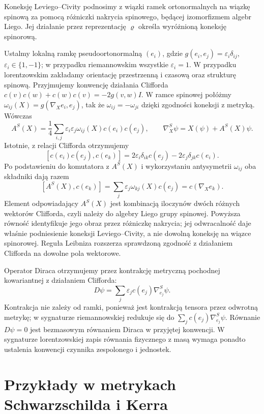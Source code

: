 \begin{uwaga}
Koneksję Leviego--Civity podnosimy z wiązki ramek
ortonormalnych na wiązkę spinową za pomocą różniczki
nakrycia spinowego, będącej izomorfizmem algebr Liego.
Jej działanie przez reprezentację $\varrho$ określa
wyróżnioną koneksję spinorową.

Ustalmy lokalną ramkę pseudoortonormalną $(e_i)$,
gdzie $g(e_i,e_j)=\varepsilon_i\delta_{ij}$,
$\varepsilon_i\in\{1,-1\}$; w przypadku riemannowskim
wszystkie $\varepsilon_i=1$. W przypadku lorentzowskim
zakładamy orientację przestrzenną i czasową oraz strukturę
spinową. Przyjmujemy konwencję działania Clifforda
$c(v)c(w)+c(w)c(v)=-2g(v,w)I$.
W ramce spinowej połóżmy
$\omega_{ij}(X)=g(\nabla_X e_i,e_j)$, tak że
$\omega_{ij}=-\omega_{ji}$ dzięki zgodności koneksji z metryką.
Wówczas
\[
 A^S(X)=\frac14\sum_{i,j}\varepsilon_i\varepsilon_j
       \omega_{ij}(X)c(e_i)c(e_j),
 \qquad \nabla_X^S\psi=X(\psi)+A^S(X)\psi .
\]
Istotnie, z relacji Clifforda otrzymujemy
\[
 [c(e_i)c(e_j),c(e_k)]
 =2\varepsilon_i\delta_{ik}c(e_j)
  -2\varepsilon_j\delta_{jk}c(e_i).
\]
Po podstawieniu do komutatora z $A^S(X)$ i wykorzystaniu
antysymetrii $\omega_{ij}$ oba składniki dają razem
\[
 [A^S(X),c(e_k)]
 =\sum_j\varepsilon_j\omega_{kj}(X)c(e_j)
 =c(\nabla_X e_k).
\]
Element odpowiadający $A^S(X)$ jest kombinacją
iloczynów dwóch różnych wektorów Clifforda, czyli należy
do algebry Liego grupy spinowej. Powyższa równość
identyfikuje jego obraz przez różniczkę nakrycia; jej
odwracalność daje właśnie podniesienie koneksji
Leviego--Civity, a nie dowolną koneksję na wiązce spinorowej.
Reguła Leibniza rozszerza sprawdzoną zgodność z działaniem
Clifforda na dowolne pola wektorowe.

Operator Diraca otrzymujemy przez kontrakcję metryczną
pochodnej kowariantnej z działaniem Clifforda:
\[
 D\psi=\sum_j\varepsilon_j c(e_j)\nabla^S_{e_j}\psi .
\]
Kontrakcja nie zależy od ramki, ponieważ jest kontrakcją
tensora przez odwrotną metrykę; w sygnaturze riemannowskiej
redukuje się do $\sum_jc(e_j)\nabla^S_{e_j}\psi$.
Równanie $D\psi=0$ jest bezmasowym równaniem Diraca
w przyjętej konwencji. W sygnaturze lorentzowskiej
zapis równania fizycznego z masą wymaga ponadto ustalenia
konwencji czynnika zespolonego i jednostek.
\end{uwaga}

\section{Przykłady w metrykach Schwarzschilda i Kerra}
\label{sec:koneksja-schwarzschild-kerr}

